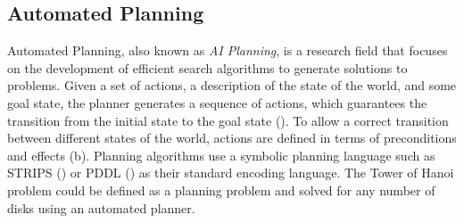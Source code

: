 \subsection{Automated Planning}
Automated Planning, also known as \textit{AI Planning}, is a research field that focuses on the development of efficient search algorithms to generate solutions to problems.
Given a set of actions, a description of the state of the world, and some goal state, the planner generates a sequence of actions, which guarantees the transition from the initial state to the goal state ().
To allow a correct transition between different states of the world, actions are defined in terms of preconditions and effects (b). 
Planning algorithms use a symbolic planning language such as STRIPS (\cite{fikes1971strips}) or PDDL (\cite{ghallab2004automated}) as their standard encoding language.
The Tower of Hanoi problem could be defined as a planning problem and solved for any number of disks using an automated planner.


